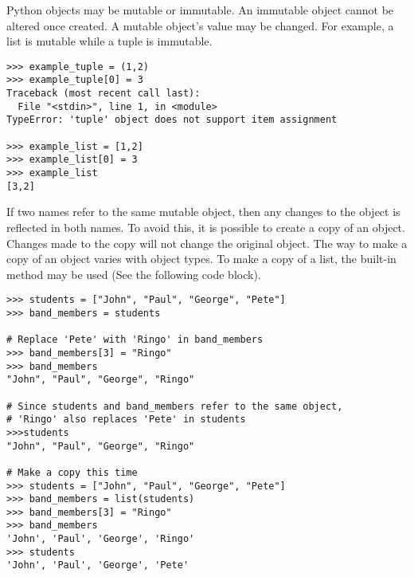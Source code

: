 Python objects may be mutable or immutable.
An immutable object cannot be altered once created.
A mutable object's value may be changed.
For example, a list is mutable while a tuple is immutable.
\begin{lstlisting}
>>> example_tuple = (1,2)
>>> example_tuple[0] = 3
Traceback (most recent call last):
  File "<stdin>", line 1, in <module>
TypeError: 'tuple' object does not support item assignment

>>> example_list = [1,2]
>>> example_list[0] = 3
>>> example_list
[3,2]
\end{lstlisting}

If two names refer to the same mutable object, then any changes to the object is reflected in both names.
To avoid this, it is possible to create a copy of an object.
Changes made to the copy will not change the original object.
The way to make a copy of an object varies with object types.
To make a copy of a list, the  built-in method may be used (See the following code block).

\begin{lstlisting}
>>> students = ["John", "Paul", "George", "Pete"]
>>> band_members = students

# Replace 'Pete' with 'Ringo' in band_members
>>> band_members[3] = "Ringo"
>>> band_members
"John", "Paul", "George", "Ringo"

# Since students and band_members refer to the same object, 
# 'Ringo' also replaces 'Pete' in students
>>>students
"John", "Paul", "George", "Ringo"

# Make a copy this time
>>> students = ["John", "Paul", "George", "Pete"]
>>> band_members = list(students)
>>> band_members[3] = "Ringo"
>>> band_members
'John', 'Paul', 'George', 'Ringo'
>>> students
'John', 'Paul', 'George', 'Pete'
\end{lstlisting}

